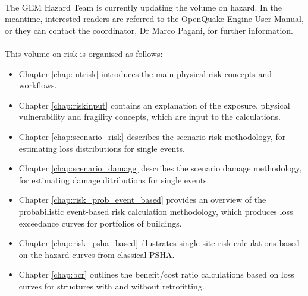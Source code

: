 \hfill \\
The GEM Hazard Team is currently updating the volume on hazard. In the meantime, interested readers are referred to the OpenQuake Engine User Manual, or they can contact the coordinator, Dr Marco Pagani, for further information. 
\hfill \\
\hfill \\
This volume on risk is organised as follows:
\begin{itemize}
\item Chapter \ref{chap:intrisk} introduces the main physical risk concepts and workflows. 
\item Chapter \ref{chap:riskinput} contains an explanation of the exposure, physical vulnerability and fragility concepts, which are input to the calculations.
\item Chapter \ref{chap:scenario_risk} describes the scenario risk 
methodology, for estimating loss distributions for single events.
\item Chapter \ref{chap:scenario_damage} describes the scenario damage 
methodology, for estimating damage ditributions for single events.
\item Chapter \ref{chap:risk_prob_event_based} provides an overview of the probabilistic event-based risk calculation methodology, which produces loss exceedance curves for portfolios of buildings.
\item Chapter \ref{chap:risk_psha_based} illustrates single-site risk calculations based on the hazard curves from classical PSHA.
\item Chapter \ref{chap:bcr} outlines the benefit/cost ratio calculations based on loss curves for structures with and without retrofitting.
\end{itemize}
